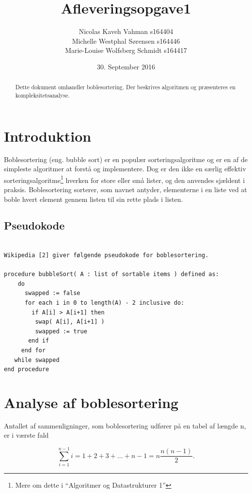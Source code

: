 \documentclass{article}
\title{Afleveringsopgave1}
\author{Nicolas Kaveh Vahman s164404\\
Michelle Westphal Sørensen s164446\\
Marie-Louise Wolfsberg Schmidt s164417}\\
\date{30. September 2016}
\begin{document}
\maketitle

\begin{abstract}
Dette dokument omhandler boblesortering. Der beskrives algoritmen
og præsenteres en kompleksitetsanalyse.

\end{abstract}
\section{Introduktion}


Boblesortering (eng. bubble sort) er en populær sorteringsalgoritme og er en af
de simpleste algoritmer at forstå og implementere. Dog er den ikke en særlig
effektiv sorteringsalgoritme\footnote{Mere om dette i “Algoritmer og Datastrukturer 1”}
hverken for store eller små lister, og den anvendes
sjældent i praksis. Boblesortering sorterer, som navnet antyder, elementerne i
en liste ved at boble hvert element gennem listen til sin rette plads i listen.

\subsection{Pseudokode}

\begin{verbatim}
    
Wikipedia [2] giver følgende pseudokode for boblesortering.

procedure bubbleSort( A : list of sortable items ) defined as:
    do
      swapped := false
      for each i in 0 to length(A) - 2 inclusive do:
        if A[i] > A[i+1] then
         swap( A[i], A[i+1] )
         swapped := true
       end if
     end for
   while swapped
end procedure
\end{verbatim}







\section{Analyse af boblesortering}

Antallet af sammenligninger, som boblesortering udfører på en tabel af længde n,
er i værste fald

\[\sum\limits_{i = 1}^{n - 1} {i = 1 + 2 + 3 + ... + n - 1 = n\frac{{n(n - 1)}}{2}.} \]
\end{document}
